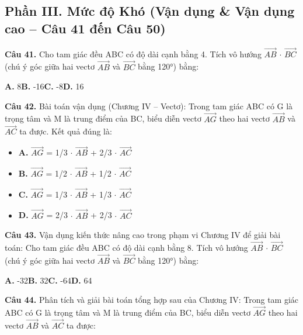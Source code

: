 \documentclass[11pt,a4paper]{article}
\begin{document}
\subsection*{\color{accent} Phần III. Mức độ Khó (Vận dụng \& Vận dụng cao -- Câu 41 đến Câu 50)}
\textbf{\color{primary} Câu 41.} Cho tam giác đều ABC có độ dài cạnh bằng 4. Tích vô hướng $\overrightarrow{AB}$ $\cdot$ $\overrightarrow{BC}$ (chú ý góc giữa hai vectơ $\overrightarrow{AB}$ và $\overrightarrow{BC}$ bằng 120°) bằng:\par
\hspace*{1.5em}\textbf{A.} 8\quad\quad \textbf{B.} -16\quad\quad \textbf{C.} -8\quad\quad \textbf{D.} 16\par\vspace{2pt}
\textbf{\color{primary} Câu 42.} Bài toán vận dụng (Chương IV – Vectơ): Trong tam giác ABC có G là trọng tâm và M là trung điểm của BC, biểu diễn vectơ $\overrightarrow{AG}$ theo hai vectơ $\overrightarrow{AB}$ và $\overrightarrow{AC}$ ta được. Kết quả đúng là:\par
\begin{itemize}\setlength{\itemsep}{1pt}\setlength{\parskip}{0pt}
  \item[] \textbf{A.} $\overrightarrow{AG}$ = 1/3 $\cdot$ $\overrightarrow{AB}$ + 2/3 $\cdot$ $\overrightarrow{AC}$
  \item[] \textbf{B.} $\overrightarrow{AG}$ = 1/2 $\cdot$ $\overrightarrow{AB}$ + 1/2 $\cdot$ $\overrightarrow{AC}$
  \item[] \textbf{C.} $\overrightarrow{AG}$ = 1/3 $\cdot$ $\overrightarrow{AB}$ + 1/3 $\cdot$ $\overrightarrow{AC}$
  \item[] \textbf{D.} $\overrightarrow{AG}$ = 2/3 $\cdot$ $\overrightarrow{AB}$ + 2/3 $\cdot$ $\overrightarrow{AC}$
\end{itemize}\vspace{2pt}
\textbf{\color{primary} Câu 43.} Vận dụng kiến thức nâng cao trong phạm vi Chương IV để giải bài toán: Cho tam giác đều ABC có độ dài cạnh bằng 8. Tích vô hướng $\overrightarrow{AB}$ $\cdot$ $\overrightarrow{BC}$ (chú ý góc giữa hai vectơ $\overrightarrow{AB}$ và $\overrightarrow{BC}$ bằng 120°) bằng:\par
\hspace*{1.5em}\textbf{A.} -32\quad\quad \textbf{B.} 32\quad\quad \textbf{C.} -64\quad\quad \textbf{D.} 64\par\vspace{2pt}
\textbf{\color{primary} Câu 44.} Phân tích và giải bài toán tổng hợp sau của Chương IV: Trong tam giác ABC có G là trọng tâm và M là trung điểm của BC, biểu diễn vectơ $\overrightarrow{AG}$ theo hai vectơ $\overrightarrow{AB}$ và $\overrightarrow{AC}$ ta được:\par
\end{document}
